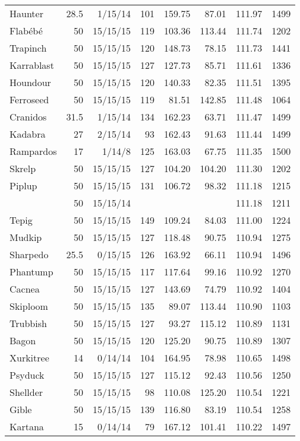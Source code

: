 \begin{longtable}{lrrrrrrr}
Haunter & 28.5 & 1/15/14 & 101 & 159.75 & 87.01 & 111.97 & 1499\\
Flabébé & 50 & 15/15/15 & 119 & 103.36 & 113.44 & 111.74 & 1202\\
Trapinch & 50 & 15/15/15 & 120 & 148.73 & 78.15 & 111.73 & 1441\\
Karrablast & 50 & 15/15/15 & 127 & 127.73 & 85.71 & 111.61 & 1336\\
Houndour & 50 & 15/15/15 & 120 & 140.33 & 82.35 & 111.51 & 1395\\
Ferroseed & 50 & 15/15/15 & 119 & 81.51 & 142.85 & 111.48 & 1064\\
Cranidos & 31.5 & 1/15/14 & 134 & 162.23 & 63.71 & 111.47 & 1499\\
Kadabra & 27 & 2/15/14 & 93 & 162.43 & 91.63 & 111.44 & 1499\\
Rampardos & 17 & 1/14/8 & 125 & 163.03 & 67.75 & 111.35 & 1500\\
Skrelp & 50 & 15/15/15 & 127 & 104.20 & 104.20 & 111.30 & 1202\\
Piplup & 50 & 15/15/15 & 131 & 106.72 & 98.32 & 111.18 & 1215\\
 & 50 & 15/15/14 & & & & 111.18 & 1211\\
Tepig & 50 & 15/15/15 & 149 & 109.24 & 84.03 & 111.00 & 1224\\
Mudkip & 50 & 15/15/15 & 127 & 118.48 & 90.75 & 110.94 & 1275\\
Sharpedo & 25.5 & 0/15/15 & 126 & 163.92 & 66.11 & 110.94 & 1496\\
Phantump & 50 & 15/15/15 & 117 & 117.64 & 99.16 & 110.92 & 1270\\
Cacnea & 50 & 15/15/15 & 127 & 143.69 & 74.79 & 110.92 & 1404\\
Skiploom & 50 & 15/15/15 & 135 & 89.07 & 113.44 & 110.90 & 1103\\
Trubbish & 50 & 15/15/15 & 127 & 93.27 & 115.12 & 110.89 & 1131\\
Bagon & 50 & 15/15/15 & 120 & 125.20 & 90.75 & 110.89 & 1307\\
Xurkitree & 14 & 0/14/14 & 104 & 164.95 & 78.98 & 110.65 & 1498\\
Psyduck & 50 & 15/15/15 & 127 & 115.12 & 92.43 & 110.56 & 1250\\
Shellder & 50 & 15/15/15 & 98 & 110.08 & 125.20 & 110.54 & 1221\\
Gible & 50 & 15/15/15 & 139 & 116.80 & 83.19 & 110.54 & 1258\\
Kartana & 15 & 0/14/14 & 79 & 167.12 & 101.41 & 110.22 & 1497\\

\end{longtable}
